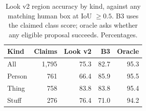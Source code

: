 \begin{table}[t]
\caption{Look v2 region accuracy by kind, against any matching human box at IoU $\geq 0.5$.
B3 uses the claimed class score; oracle asks whether any eligible proposal succeeds. Percentages.}
\label{tab:look-kind}
\centering\footnotesize\setlength{\tabcolsep}{4pt}
\begin{tabular}{@{}lrrrr@{}}
\toprule
Kind & Claims & Look v2 & B3 & Oracle \\
\midrule
All & 1{,}795 & 75.3 & 82.7 & 95.3 \\
Person & 761 & 66.4 & 85.9 & 95.5 \\
Thing & 758 & 83.8 & 83.8 & 95.4 \\
Stuff & 276 & 76.4 & 71.0 & 94.2 \\
\bottomrule
\end{tabular}
\end{table}

